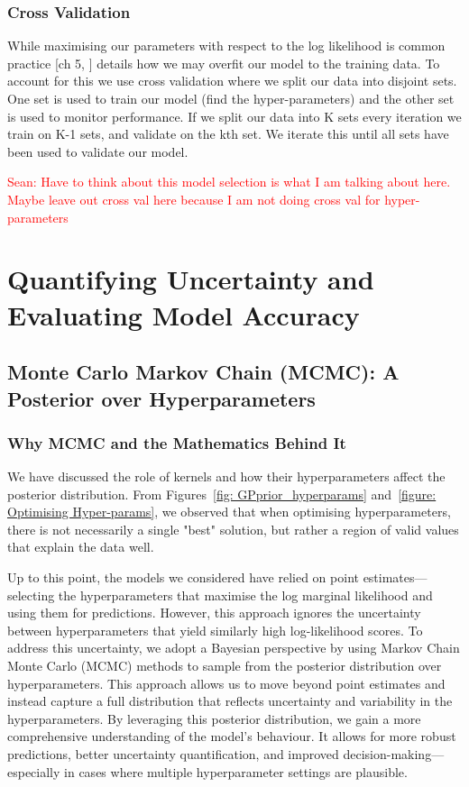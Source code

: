 \documentclass{article}
\newcommand{\Sean}[1]{{\textcolor{red}{{Sean: #1}} }}
\begin{document}
\subsubsection{Cross Validation}

While maximising our parameters with respect to the log likelihood is common practice [ch 5, \cite{bible}] details how we may overfit our model to the training data.
To account for this we use cross validation where we split our data into disjoint sets. One set is used to train our model (find the hyper-parameters) and the other set is used to monitor performance.
If we split our data into K sets every iteration we train on K-1 sets, and validate on the kth set. We iterate this until all sets have been used to validate our model. 

\Sean{Have to think about this model selection is what I am talking about here. Maybe leave out cross val here because I am not doing cross val for hyper-parameters}


\section{Quantifying Uncertainty and Evaluating Model Accuracy}
\label{sec:uncertainty_and_evaluation}
\subsection{Monte Carlo Markov Chain (MCMC): A Posterior over Hyperparameters}
\label{sec: MCMC}

\subsubsection*{Why MCMC and the Mathematics Behind It}

We have discussed the role of kernels and how their hyperparameters affect the posterior distribution. From Figures~\ref{fig: GPprior_hyperparams} and~\ref{figure: Optimising Hyper-params}, we observed that when optimising hyperparameters, there is not necessarily a single "best" solution, but rather a region of valid values that explain the data well.

\noindent
Up to this point, the models we considered have relied on point estimates—selecting the hyperparameters that maximise the log marginal likelihood and using them for predictions. However, this approach ignores the uncertainty between hyperparameters that yield similarly high log-likelihood scores.
To address this uncertainty, we adopt a Bayesian perspective by using Markov Chain Monte Carlo (MCMC) methods to sample from the posterior distribution over hyperparameters. This approach allows us to move beyond point estimates and instead capture a full distribution that reflects uncertainty and variability in the hyperparameters.
By leveraging this posterior distribution, we gain a more comprehensive understanding of the model's behaviour. It allows for more robust predictions, better uncertainty quantification, and improved decision-making—especially in cases where multiple hyperparameter settings are plausible.
\end{document}
